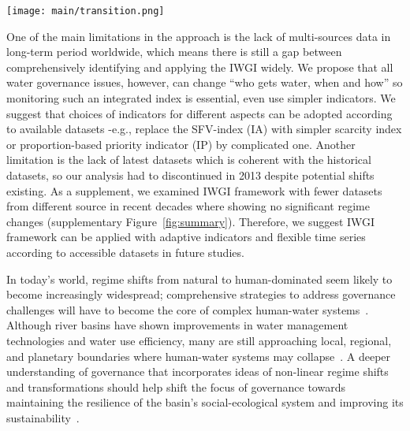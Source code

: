 \begin{figure*}[htbp!]
	\centering
	\texttt{[image: main/transition.png]}
	\caption{
		Transition schema in hydrosocial cycle and water governance regimes. The natural water cycle dominates blue pathways, while socio-economic feedback dominates red.
		\textbf{A.} As socio-economic systems develop, non-provisioning water demand increases; simultaneously, increased adaptive capacity by engineering allows people to manage water resources to alleviate water stress.
		\textbf{B.} With further human interventions, trade-offs between provisioning-purpose and non-provisioning water use become prominent; a basin-wide socio-economic system requires more organized water governance.
		Thus, \textbf{C. the hydrosocial water cycle transition} correlates with the water governance regime shifts. The transformation governance regime shift occurs following the water deficit, with the rapid growth of adaptive capacity.
		\textbf{D. Water governance challenges} Through the transitional regimes, water governance faces primarily economic and environmental challenges but social and policy challenges later.
	}\label{fig:summary}
\end{figure*}


One of the main limitations in the approach is the lack of multi-sources data in long-term period worldwide, which means there is still a gap between comprehensively identifying and applying the IWGI widely.
We propose that all water governance issues, however, can change ``who gets water, when and how'' so monitoring such an integrated index is essential, even use simpler indicators.
We suggest that choices of indicators for different aspects can be adopted according to available datasets -e.g., replace the SFV-index (IA) with simpler scarcity index or proportion-based priority indicator (IP) by complicated one.
Another limitation is the lack of latest datasets which is coherent with the historical datasets, so our analysis had to discontinued in 2013 despite potential shifts existing.
As a supplement, we examined IWGI framework with fewer datasets from different source in recent decades where showing no significant regime changes (supplementary Figure~\ref{fig:summary}).  %
Therefore, we suggest IWGI framework can be applied with adaptive indicators and flexible time series according to accessible datasets in future studies.

In today's world, regime shifts from natural to human-dominated seem likely to become increasingly widespread; comprehensive strategies to address governance challenges will have to become the core of complex human-water systems~\cite{cumming2018,cumming2014,jaeger2019}.
Although river basins have shown improvements in water management technologies and water use efficiency, many are still approaching local, regional, and planetary boundaries where human-water systems may collapse~\cite{gleeson2020, wang-erlandsson2022}.
A deeper understanding of governance that incorporates ideas of non-linear regime shifts and transformations should help shift the focus of governance towards maintaining the resilience of the basin’s social-ecological system and improving its sustainability~\cite{falkenmark2019}.
